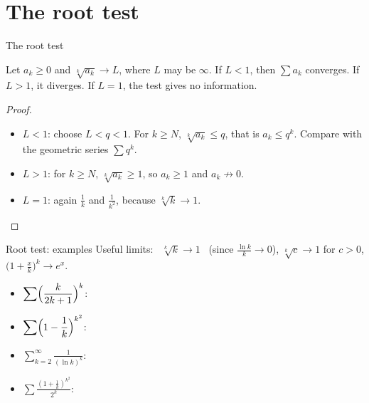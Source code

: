 \documentclass[10pt]{wosm-slides}
\begin{document}
\section{The root test}

\begin{frame}{The root test}
  \begin{theorem}
    Let $a_k \ge 0$ and $\sqrt[k]{a_k} \to L$, where $L$ may be $\infty$.
    If $L < 1$, then $\sum a_k$ converges. If $L > 1$, it diverges.
    If $L = 1$, the test gives no information.
  \end{theorem}
  \pause
  \begin{proof}
    \begin{itemize}
      \item $L < 1$: choose $L < q < 1$. For $k \ge N$, $\sqrt[k]{a_k} \le q$, that is
        $a_k \le q^k$. Compare with the geometric series $\sum q^k$.
      \item $L > 1$: for $k \ge N$, $\sqrt[k]{a_k} \ge 1$, so $a_k \ge 1$ and
        $a_k \not\to 0$.
      \item $L = 1$: again $\frac1k$ and $\frac1{k^2}$, because $\sqrt[k]{k} \to 1$. \qedhere
    \end{itemize}
  \end{proof}
\end{frame}

\begin{frame}{Root test: examples}
  Useful limits: \ $\sqrt[k]{k} \to 1$ \ (since $\frac{\ln k}{k} \to 0$), \quad
  $\sqrt[k]{c} \to 1$ for $c > 0$, \quad $\bigl(1 + \frac{x}{k}\bigr)^k \to e^x$.
  \begin{itemize}
    \item $\displaystyle\sum \Bigl(\frac{k}{2k+1}\Bigr)^k$:
    \item $\displaystyle\sum \Bigl(1 - \frac1k\Bigr)^{k^2}$:
    \item $\displaystyle\sum_{k=2}^\infty \frac{1}{(\ln k)^k}$:
    \item $\displaystyle\sum \frac{(1 + \frac1k)^{k^2}}{2^k}$:
  \end{itemize}
\end{frame}
\end{document}
